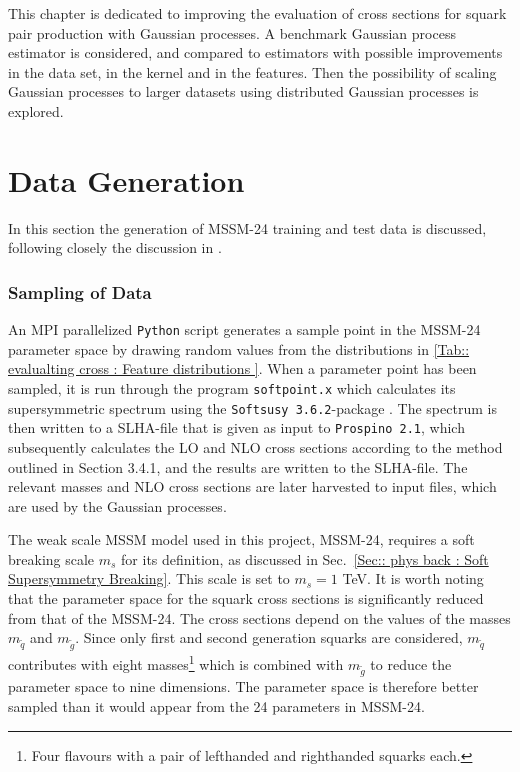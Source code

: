 \documentclass[twoside,english]{uiofysmaster}
\begin{document}
{This chapter is dedicated to improving the evaluation of cross sections for squark pair production with Gaussian processes. A benchmark Gaussian process estimator is considered, and compared to estimators with possible improvements in the data set, in the kernel and in the features. Then the possibility of scaling Gaussian processes to larger datasets using distributed Gaussian processes is explored.

\section{Data Generation}

In this section the generation of MSSM-24 training and test data is discussed, following closely the discussion in \cite{sparre2018fast}. 

\subsubsection{Sampling of Data}

An MPI parallelized \verb|Python| script generates a sample point in the MSSM-24 parameter space by drawing random values from the distributions in \autoref{Tab:: evalualting cross : Feature distributions }. When a parameter point has been sampled, it is run through the program \verb|softpoint.x| which calculates its supersymmetric spectrum using the \verb|Softsusy 3.6.2|-package \cite{ALLANACH2002305}. The spectrum is then written to a SLHA-file \cite{skands2004susy} that is given as input to \verb|Prospino 2.1|, which subsequently calculates the LO and NLO cross sections according to the method outlined in Section 3.4.1, and the results are written to the SLHA-file. The relevant masses and NLO cross sections are later harvested to input files, which are used by the Gaussian processes. 

The weak scale MSSM model used in this project, MSSM-24, requires a soft breaking scale $m_s$ for its definition, as discussed in Sec.~\ref{Sec:: phys back : Soft Supersymmetry Breaking}. This scale is set to $m_s=1$ TeV. It is worth noting that the parameter space for the squark cross sections is significantly reduced from that of the MSSM-24. The cross sections depend on the values of the masses $m_{\widetilde{q}}$ and $m_{\widetilde{g}}$. Since only first and second generation squarks are considered, $m_{\widetilde{q}}$ contributes with eight masses\footnote{Four flavours with a pair of lefthanded and righthanded squarks each.} which is combined with $m_{\widetilde{g}}$ to reduce the parameter space to nine dimensions. The parameter space is therefore better sampled than it would appear from the 24 parameters in MSSM-24.

}
\end{document}
